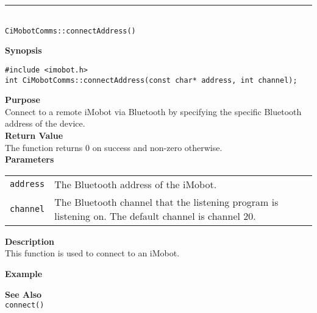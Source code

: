 \noindent
\vspace{5pt}
\rule{4.5in}{0.015in} \\
\noindent
{\LARGE \texttt{CiMobotComms::connectAddress()}}\\
{}

\noindent
{\bf Synopsis}\\
\begin{verbatim}
#include <imobot.h>
int CiMobotComms::connectAddress(const char* address, int channel);
\end{verbatim}

\noindent
{\bf Purpose}\\
Connect to a remote iMobot via Bluetooth by specifying the specific Bluetooth
address of the device.\\

\noindent
{\bf Return Value}\\
The function returns 0 on success and non-zero otherwise.\\

\noindent
{\bf Parameters}
\vspace{-0.1in}
\begin{description}
\item               
\begin{tabular}{p{10 mm}p{145 mm}}
\texttt{address} & The Bluetooth address of the iMobot. \\
\texttt{channel} & The Bluetooth channel that the listening program is
listening on. The default channel is channel 20. \\
\end{tabular}
\end{description}

\noindent
{\bf Description}\\
This function is used to connect to an iMobot. 

\noindent
{\bf Example}\\
\noindent

\noindent
{\bf See Also}\\
\texttt{connect()}


